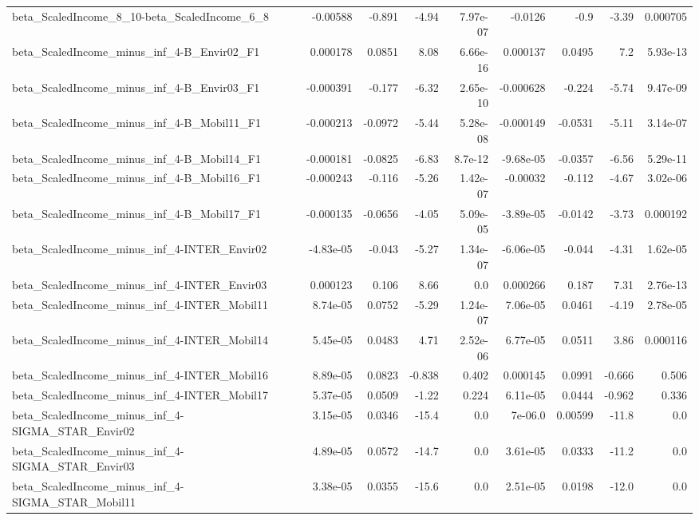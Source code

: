 \begin{tabular}{lrrrrrrrr}
beta_ScaledIncome_8_10-beta_ScaledIncome_6_8 & -0.00588 & -0.891 & -4.94 & 7.97e-07 & -0.0126 & -0.9 & -3.39 & 0.000705 \\
beta_ScaledIncome_minus_inf_4-B_Envir02_F1 & 0.000178 & 0.0851 & 8.08 & 6.66e-16 & 0.000137 & 0.0495 & 7.2 & 5.93e-13 \\
beta_ScaledIncome_minus_inf_4-B_Envir03_F1 & -0.000391 & -0.177 & -6.32 & 2.65e-10 & -0.000628 & -0.224 & -5.74 & 9.47e-09 \\
beta_ScaledIncome_minus_inf_4-B_Mobil11_F1 & -0.000213 & -0.0972 & -5.44 & 5.28e-08 & -0.000149 & -0.0531 & -5.11 & 3.14e-07 \\
beta_ScaledIncome_minus_inf_4-B_Mobil14_F1 & -0.000181 & -0.0825 & -6.83 & 8.7e-12 & -9.68e-05 & -0.0357 & -6.56 & 5.29e-11 \\
beta_ScaledIncome_minus_inf_4-B_Mobil16_F1 & -0.000243 & -0.116 & -5.26 & 1.42e-07 & -0.00032 & -0.112 & -4.67 & 3.02e-06 \\
beta_ScaledIncome_minus_inf_4-B_Mobil17_F1 & -0.000135 & -0.0656 & -4.05 & 5.09e-05 & -3.89e-05 & -0.0142 & -3.73 & 0.000192 \\
beta_ScaledIncome_minus_inf_4-INTER_Envir02 & -4.83e-05 & -0.043 & -5.27 & 1.34e-07 & -6.06e-05 & -0.044 & -4.31 & 1.62e-05 \\
beta_ScaledIncome_minus_inf_4-INTER_Envir03 & 0.000123 & 0.106 & 8.66 & 0.0 & 0.000266 & 0.187 & 7.31 & 2.76e-13 \\
beta_ScaledIncome_minus_inf_4-INTER_Mobil11 & 8.74e-05 & 0.0752 & -5.29 & 1.24e-07 & 7.06e-05 & 0.0461 & -4.19 & 2.78e-05 \\
beta_ScaledIncome_minus_inf_4-INTER_Mobil14 & 5.45e-05 & 0.0483 & 4.71 & 2.52e-06 & 6.77e-05 & 0.0511 & 3.86 & 0.000116 \\
beta_ScaledIncome_minus_inf_4-INTER_Mobil16 & 8.89e-05 & 0.0823 & -0.838 & 0.402 & 0.000145 & 0.0991 & -0.666 & 0.506 \\
beta_ScaledIncome_minus_inf_4-INTER_Mobil17 & 5.37e-05 & 0.0509 & -1.22 & 0.224 & 6.11e-05 & 0.0444 & -0.962 & 0.336 \\
beta_ScaledIncome_minus_inf_4-SIGMA_STAR_Envir02 & 3.15e-05 & 0.0346 & -15.4 & 0.0 & 7e-06.0 & 0.00599 & -11.8 & 0.0 \\
beta_ScaledIncome_minus_inf_4-SIGMA_STAR_Envir03 & 4.89e-05 & 0.0572 & -14.7 & 0.0 & 3.61e-05 & 0.0333 & -11.2 & 0.0 \\
beta_ScaledIncome_minus_inf_4-SIGMA_STAR_Mobil11 & 3.38e-05 & 0.0355 & -15.6 & 0.0 & 2.51e-05 & 0.0198 & -12.0 & 0.0 \\

\end{tabular}
